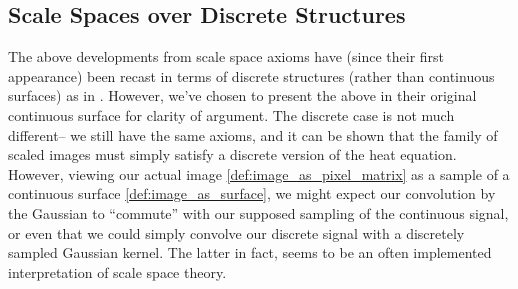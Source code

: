 %    	
%    	
%    
    
    
    \subsection{Scale Spaces over Discrete Structures} \label{subsec:discrete-scale-space}
    
    The above developments from scale space axioms have (since their first appearance)
    been recast in terms of discrete structures (rather than continuous surfaces) as in \cite{lindeberg-discrete}. However, we've chosen to present the above in their original continuous surface for clarity of argument. The discrete case is not much different--
    we still have the same axioms, and it can be shown that the family of scaled images
    must simply satisfy a discrete version of the heat equation.
    However, viewing our actual image
    \cref{def:image_as_pixel_matrix} as a sample of a continuous
    surface \cref{def:image_as_surface},
    we might  expect our convolution by the Gaussian to ``commute'' with our supposed sampling of the continuous signal,
    or even that we could simply convolve our discrete signal with a discretely sampled Gaussian kernel. The latter in fact, seems to be an often implemented interpretation of scale space theory.
    
